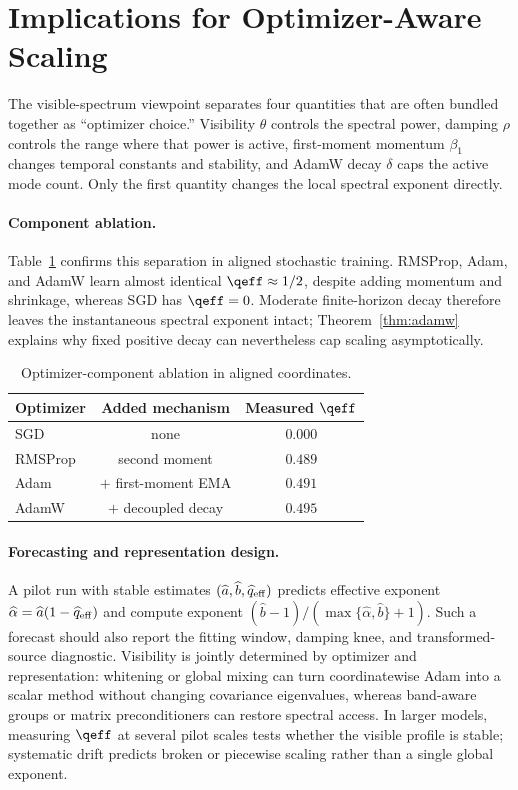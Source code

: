 \section{Implications for Optimizer-Aware Scaling}

The visible-spectrum viewpoint separates four quantities that are often bundled together as ``optimizer choice.''  Visibility $\theta$ controls the spectral power, damping $\rho$ controls the range where that power is active, first-moment momentum $\beta_1$ changes temporal constants and stability, and AdamW decay $\delta$ caps the active mode count.  Only the first quantity changes the local spectral exponent directly.

\paragraph{Component ablation.}
Table~\ref{tab:optimizer-components} confirms this separation in aligned stochastic training.  RMSProp, Adam, and AdamW learn almost identical $\qeff\approx1/2$, despite adding momentum and shrinkage, whereas SGD has $\qeff=0$.  Moderate finite-horizon decay therefore leaves the instantaneous spectral exponent intact; Theorem~\ref{thm:adamw} explains why fixed positive decay can nevertheless cap scaling asymptotically.

\begin{table}[t]
\centering
\small
\caption{Optimizer-component ablation in aligned coordinates.}
\label{tab:optimizer-components}
\begin{tabular}{lcc}
\toprule
Optimizer & Added mechanism & Measured $\qeff$\\
\midrule
SGD & none & $0.000$\\
RMSProp & second moment & $0.489$\\
Adam & $+$ first-moment EMA & $0.491$\\
AdamW & $+$ decoupled decay & $0.495$\\
\bottomrule
\end{tabular}
\end{table}

\paragraph{Forecasting and representation design.}
A pilot run with stable estimates $(\widehat a,\widehat b,\widehat q_{\rm eff})$ predicts effective exponent $\widehat\alpha=\widehat a(1-\widehat q_{\rm eff})$ and compute exponent $(\widehat b-1)/(\max\{\widehat\alpha,\widehat b\}+1)$.  Such a forecast should also report the fitting window, damping knee, and transformed-source diagnostic.  Visibility is jointly determined by optimizer and representation: whitening or global mixing can turn coordinatewise Adam into a scalar method without changing covariance eigenvalues, whereas band-aware groups or matrix preconditioners can restore spectral access.  In larger models, measuring $\qeff$ at several pilot scales tests whether the visible profile is stable; systematic drift predicts broken or piecewise scaling rather than a single global exponent.
